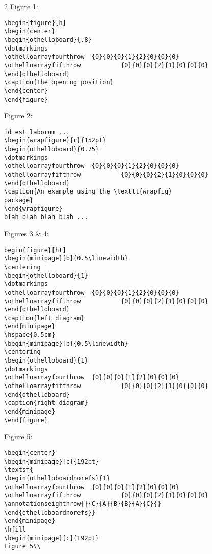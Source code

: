 \documentclass[a4paper,12pt]{article}
\begin{document}
\begin{scriptsize}
\begin{multicols}{2}
\noindent Figure 1:
\begin{verbatim}
\begin{figure}[h]
\begin{center}
\begin{othelloboard}{.8}
\dotmarkings
\othelloarrayfourthrow	{0}{0}{0}{1}{2}{0}{0}{0}
\othelloarrayfifthrow			{0}{0}{0}{2}{1}{0}{0}{0}
\end{othelloboard}
\caption{The opening position}
\end{center}
\end{figure}
\end{verbatim}

\noindent Figure 2:
\begin{verbatim}
id est laborum ...
\begin{wrapfigure}{r}{152pt}
\begin{othelloboard}{0.75}
\dotmarkings
\othelloarrayfourthrow	{0}{0}{0}{1}{2}{0}{0}{0}
\othelloarrayfifthrow			{0}{0}{0}{2}{1}{0}{0}{0}
\end{othelloboard}
\caption{An example using the \texttt{wrapfig} 
package}
\end{wrapfigure}
blah blah blah blah ...
\end{verbatim}

\noindent Figures 3 \& 4:
\begin{verbatim}
begin{figure}[ht]
\begin{minipage}[b]{0.5\linewidth}
\centering
\begin{othelloboard}{1}
\dotmarkings
\othelloarrayfourthrow	{0}{0}{0}{1}{2}{0}{0}{0}
\othelloarrayfifthrow			{0}{0}{0}{2}{1}{0}{0}{0}
\end{othelloboard}
\caption{left diagram}
\end{minipage}
\hspace{0.5cm}
\begin{minipage}[b]{0.5\linewidth}
\centering
\begin{othelloboard}{1}
\dotmarkings
\othelloarrayfourthrow	{0}{0}{0}{1}{2}{0}{0}{0}
\othelloarrayfifthrow			{0}{0}{0}{2}{1}{0}{0}{0}
\end{othelloboard}
\caption{right diagram}
\end{minipage}
\end{figure}
\end{verbatim}

\noindent Figure 5:
\begin{verbatim}
\begin{center}
\begin{minipage}[c]{192pt}
\textsf{
\begin{othelloboardnorefs}{1}
\othelloarrayfourthrow	{0}{0}{0}{1}{2}{0}{0}{0}
\othelloarrayfifthrow			{0}{0}{0}{2}{1}{0}{0}{0}
\annotationseighthrow{}{C}{A}{B}{B}{A}{C}{}
\end{othelloboardnorefs}}
\end{minipage}
\hfill
\begin{minipage}[c]{192pt}
Figure 5\\


\end{verbatim}
\end{multicols}
\end{scriptsize}
\end{document}
